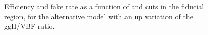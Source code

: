 \begin{figure}[htb]
\centering
{}
\caption{Efficiency and fake rate as a function of \MET and \mt cuts in the fiducial region, for the alternative model with an up variation of the ggH/VBF ratio.}\label{fig:eff_fake_up}
\end{figure}

